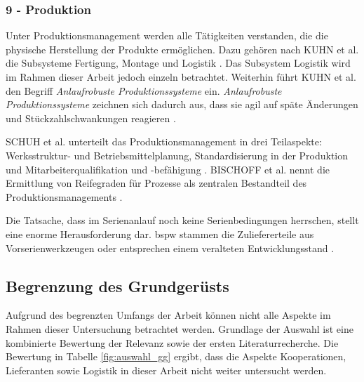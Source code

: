 \subsubsection*{9 - Produktion}
Unter Produktionsmanagement werden alle Tätigkeiten verstanden, die die physische Herstellung der Produkte ermöglichen. Dazu gehören nach KUHN et al. die Subsysteme Fertigung, Montage und Logistik \autocite{Kuhn2002}. Das Subsystem Logistik wird im Rahmen dieser Arbeit jedoch einzeln betrachtet. Weiterhin führt KUHN et al. den Begriff \textit{Anlaufrobuste Produktionssysteme} ein. \textit{Anlaufrobuste Produktionssysteme} zeichnen sich dadurch aus, dass sie agil auf späte Änderungen und Stückzahlschwankungen reagieren \autocite[20]{Bischoff2007}. 

SCHUH et al. unterteilt das Produktionsmanagement in drei Teilaspekte: Werksstruktur- und Betriebsmittelplanung, Standardisierung in der Produktion und Mitarbeiterqualifikation und {-befähigung} \autocite[177]{Schuh2008}. 
BISCHOFF et al. nennt die Ermittlung von Reifegraden für Prozesse als zentralen Bestandteil des Produktionsmanagements \autocite[20]{Bischoff2007}. 

Die Tatsache, dass im Serienanlauf noch keine Serienbedingungen herrschen, stellt eine enorme Herausforderung dar. \Gls{bspw} stammen die Zuliefererteile aus Vorserienwerkzeugen oder entsprechen einem veralteten Entwicklungsstand \autocite[21]{Kuhn2002}.

\subsection*{Begrenzung des Grundgerüsts}

Aufgrund des begrenzten Umfangs der Arbeit können nicht alle Aspekte im Rahmen dieser Untersuchung betrachtet werden. Grundlage der Auswahl ist eine kombinierte Bewertung der Relevanz sowie der ersten Literaturrecherche. 
Die Bewertung in Tabelle \ref{fig:auswahl_gg}
%  
ergibt, dass die Aspekte Kooperationen, Lieferanten sowie Logistik in dieser Arbeit nicht weiter untersucht werden. 


